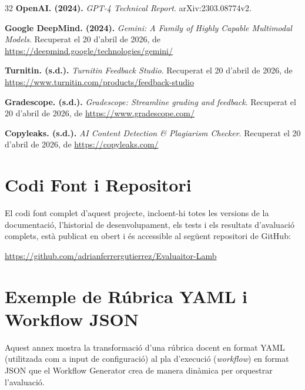 \documentclass[12pt,a4paper,twoside]{report}
\begin{document}
\begin{thebibliography}{32}
     \textbf{OpenAI. (2024).} \textit{GPT-4 Technical Report}. arXiv:2303.08774v2.

     \textbf{Google DeepMind. (2024).} \textit{Gemini: A Family of Highly Capable Multimodal Models}. Recuperat el 20 d'abril de 2026, de \url{https://deepmind.google/technologies/gemini/}

     \textbf{Turnitin. (s.d.).} \textit{Turnitin Feedback Studio}. Recuperat el 20 d'abril de 2026, de \url{https://www.turnitin.com/products/feedback-studio}

     \textbf{Gradescope. (s.d.).} \textit{Gradescope: Streamline grading and feedback}. Recuperat el 20 d'abril de 2026, de \url{https://www.gradescope.com/}

     \textbf{Copyleaks. (s.d.).} \textit{AI Content Detection \& Plagiarism Checker}. Recuperat el 20 d'abril de 2026, de \url{https://copyleaks.com/}

\end{thebibliography}


\appendix

\chapter{Codi Font i Repositori}
\label{annex:repositori}
El codi font complet d'aquest projecte, incloent-hi totes les versions de la documentació, l'historial de desenvolupament, els tests i els resultats d'avaluació complets, està publicat en obert i és accessible al següent repositori de GitHub:

\begin{center}
    \url{https://github.com/adrianferrergutierrez/Evaluaitor-Lamb}
\end{center}


\chapter{Exemple de R\'ubrica YAML i Workflow JSON}
\label{annex:rubrica-workflow}
Aquest annex mostra la transformaci\'o d'una r\'ubrica docent en format YAML (utilitzada com a input de configuraci\'o) al pla d'execuci\'o (\textit{workflow}) en format JSON que el Workflow Generator crea de manera din\`amica per orquestrar l'avaluaci\'o.
\end{document}

